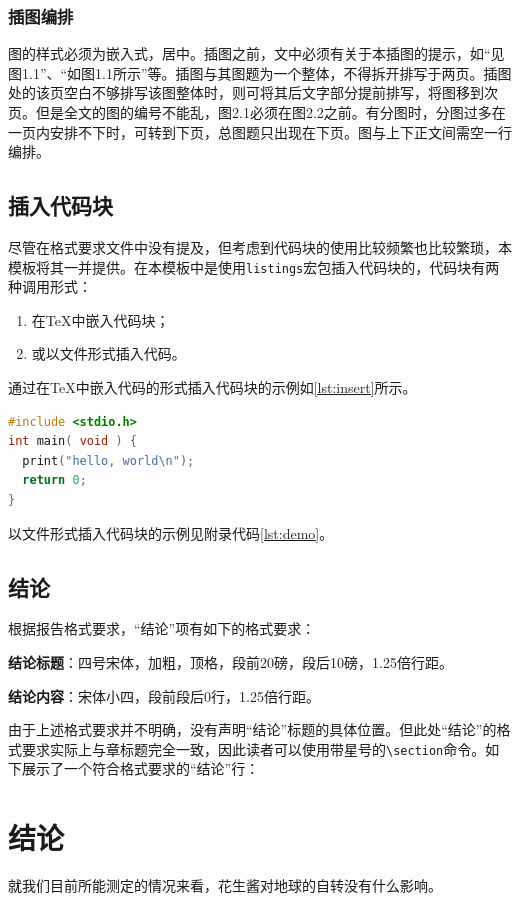 \subsubsection{插图编排}

图的样式必须为嵌入式，居中。插图之前，文中必须有关于本插图的提示，如“见图1.1”、“如图1.1所示”等。插图与其图题为一个整体，不得拆开排写于两页。插图处的该页空白不够排写该图整体时，则可将其后文字部分提前排写，将图移到次页。但是全文的图的编号不能乱，图2.1必须在图2.2之前。有分图时，分图过多在一页内安排不下时，可转到下页，总图题只出现在下页。图与上下正文间需空一行编排。

\subsection{插入代码块}

尽管在格式要求文件中没有提及，但考虑到代码块的使用比较频繁也比较繁琐，本模板将其一并提供。在本模板中是使用\texttt{listings}宏包插入代码块的，代码块有两种调用形式：

\begin{enumerate}
  \item 在\TeX 中嵌入代码块；
  \item 或以文件形式插入代码。
\end{enumerate}

通过在\TeX 中嵌入代码的形式插入代码块的示例如\ref{lst:insert}所示。

\begin{lstlisting}[language=C, caption={在\TeX 中嵌入代码的形式插入代码块\label{lst:insert}}]
#include <stdio.h>
int main( void ) {
  print("hello, world\n");
  return 0;
}
\end{lstlisting}

以文件形式插入代码块的示例见附录代码\ref{lst:demo}。
    
\subsection{结论}

根据报告格式要求，“结论”项有如下的格式要求：

\textbf{结论标题}：四号宋体，加粗，顶格，段前20磅，段后10磅，1.25倍行距。

\textbf{结论内容}：宋体小四，段前段后0行，1.25倍行距。

由于上述格式要求并不明确，没有声明“结论”标题的具体位置。但此处“结论”的格式要求实际上与章标题完全一致，因此读者可以使用带星号的\texttt{\textbackslash \*section}命令。如下展示了一个符合格式要求的“结论”行：

\section*{结论}

就我们目前所能测定的情况来看，花生酱对地球的自转没有什么影响\autocite{PeanutButter}。
